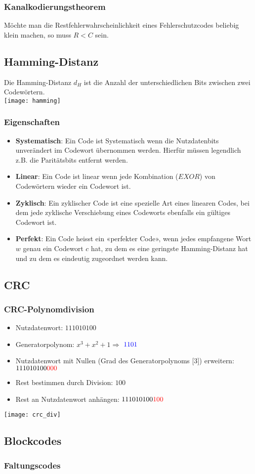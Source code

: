 \subsubsection{Kanalkodierungstheorem}
Möchte man die Restfehlerwahrscheinlichkeit eines Fehlerschutzcodes beliebig klein machen,
so muss $R < C$ sein.
\subsection{Hamming-Distanz}
Die Hamming-Distanz $d_H$ ist die Anzahl der unterschiedlichen Bits zwischen zwei Codewörtern.\\
\texttt{[image: hamming]}
\subsubsection{Eigenschaften}
\begin{itemize}
    \item \textbf{Systematisch}: Ein Code ist Systematisch wenn die Nutzdatenbits unverändert im Codewort übernommen werden.
    Hierfür müssen legendlich z.B. die Paritätsbits entfernt werden.
    \item \textbf{Linear}: Ein Code ist linear wenn jede Kombination ($EXOR$) von Codewörtern wieder ein Codewort ist.
    \item \textbf{Zyklisch}: Ein zyklischer Code ist eine spezielle Art eines linearen Codes, bei dem jede 
    zyklische Verschiebung eines Codeworts ebenfalls ein gültiges Codewort ist.
    \item \textbf{Perfekt}: Ein Code heisst ein «perfekter Code», wenn jedes empfangene Wort $w$
    genau ein Codewort $c$ hat, zu dem es eine geringste Hamming-Distanz
    hat und zu dem es eindeutig zugeordnet werden kann.
\end{itemize}
\subsection{CRC}
\subsubsection{CRC-Polynomdivision}
\begin{itemize}
    \item Nutzdatenwort: $111010100$
    \item Generatorpolynom: $x^3 + x^2 + 1 \Rightarrow$ $\textcolor{blue}{1101}$
    \item Nutzdatenwort mit Nullen (Grad des Generatorpolynoms [3]) erweitern: $111010100\textcolor{red}{000}$
    \item Rest bestimmen durch Division: $100$
    \item Rest an Nutzdatenwort anhängen: $111010100\textcolor{red}{100}$
\end{itemize}
\texttt{[image: crc\_div]}
\subsection{Blockcodes}
\subsubsection{Faltungscodes}